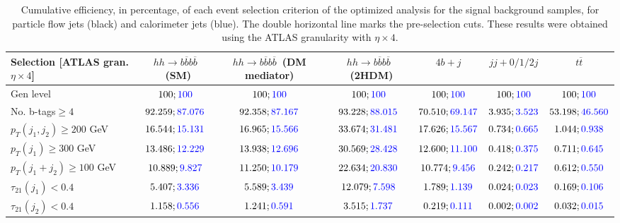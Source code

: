 \begin{landscape}
		\begin{table}
			\centering
			\caption{Cumulative efficiency, in percentage, of each event selection criterion of the optimized analysis for the signal background samples, for particle flow jets (black) and calorimeter jets (blue). The double horizontal line marks the pre-selection cuts. These results were obtained using the ATLAS granularity with $\eta\times 4$.}
			\begin{tabular}{lcccccc}
				\toprule 
				\textbf{Selection [ATLAS gran. $\eta\times 4$]} & $hh\rightarrow b\overline{b}b\overline{b}$~(SM) & $hh\rightarrow b\overline{b}b\overline{b}$~(DM mediator) & $hh\rightarrow b\overline{b}b\overline{b}$~(2HDM) & $4b+j$  & $jj+0/1/2 j$ & $t\overline{t}$ \\
				\midrule
				Gen level & $100;\textcolor{blue}{100}$ & $100;\textcolor{blue}{100}$ &$100;\textcolor{blue}{100}$& $100;\textcolor{blue}{100}$& $100;\textcolor{blue}{100}$& $100;\textcolor{blue}{100}$ \\
				\rowcolor{black!7}No. b-tags$\geq 4$&$92.259;\textcolor{blue}{87.076}$&$92.358;\textcolor{blue}{87.167}$&$93.228;\textcolor{blue}{88.015}$&$70.510;\textcolor{blue}{69.147}$&$3.935;\textcolor{blue}{3.523}$&$53.198;\textcolor{blue}{46.560}$\\
				$p_T(j_1,j_2)\geq200$ GeV & $16.544;\textcolor{blue}{15.131}$ & $16.965;\textcolor{blue}{15.566}$&$33.674;\textcolor{blue}{31.481}$ &$17.626;\textcolor{blue}{15.567}$&$0.734;\textcolor{blue}{0.665}$&$1.044;\textcolor{blue}{0.938}$\\ 
				\midrule \midrule
				\rowcolor{black!7}$p_T(j_1)\geq 300$ GeV & $13.486;\textcolor{blue}{12.229}$ &$13.938;\textcolor{blue}{12.696}$  &$30.569;\textcolor{blue}{28.428}$&$12.600;\textcolor{blue}{11.100}$&$0.418;\textcolor{blue}{0.375}$&$0.711;\textcolor{blue}{0.645}$\\ 
				$p_T(j_1+j_2)\geq 100$ GeV &$10.889;\textcolor{blue}{9.827}$ & $11.250;\textcolor{blue}{10.179}$ &$22.634;\textcolor{blue}{20.830}$&$10.774;\textcolor{blue}{9.456}$&$0.242;\textcolor{blue}{0.217}$&$0.612;\textcolor{blue}{0.550}$\\
				\rowcolor{black!7}$\tau_{21}(j_1)<0.4$ & $5.407;\textcolor{blue}{3.336}$& $5.589;\textcolor{blue}{3.439}$&$12.079;\textcolor{blue}{7.598}$&$1.789;\textcolor{blue}{1.139}$&$0.024;\textcolor{blue}{0.023}$&$0.169;\textcolor{blue}{0.106}$\\
				$\tau_{21}(j_2)<0.4$ &$1.158;\textcolor{blue}{0.556}$ &$1.241;\textcolor{blue}{0.591}$ &$3.515;\textcolor{blue}{1.737}$&$0.219;\textcolor{blue}{0.111}$&$0.002;\textcolor{blue}{0.002}$&$0.032;\textcolor{blue}{0.015}$\\

\end{tabular}
\end{table}
\end{landscape}
